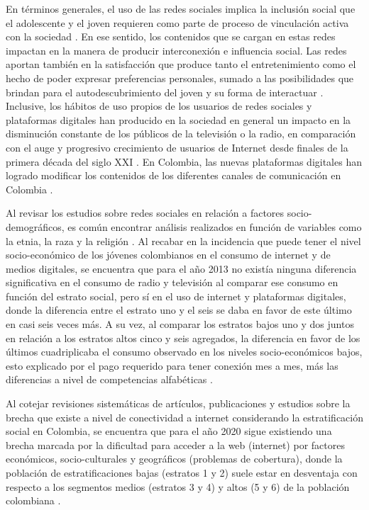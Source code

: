 \documentclass[spanish]{textolivre}
\begin{document}
En términos generales, el uso de las redes sociales implica la inclusión social que el adolescente y el joven requieren como parte de proceso de vinculación activa con la sociedad \cite{notley2009}. En ese sentido, los contenidos que se cargan en estas redes impactan en la manera de producir interconexión e influencia social. Las redes aportan también en la satisfacción que produce tanto el entretenimiento como  el hecho de poder expresar preferencias personales, sumado a las posibilidades que brindan para el autodescubrimiento del joven y su forma de interactuar \cite{arcilacalderon2017}. Inclusive, los hábitos de uso propios de los usuarios de redes sociales y plataformas digitales han producido en la sociedad en general un impacto en la disminución constante de los públicos de la televisión o la radio, en comparación con el auge y progresivo crecimiento de usuarios de Internet desde finales de la primera década del siglo XXI \cite{fraile2011}. En Colombia, las nuevas plataformas digitales han logrado modificar los contenidos de los diferentes canales de comunicación en Colombia \cite{gonzalez-gomez2018}.

Al revisar los estudios sobre redes sociales en relación a factores socio-demográficos, es común encontrar análisis realizados en función de variables como la etnia, la raza y la religión \cite{almansa-martinez2013}. Al recabar en la incidencia que puede tener el nivel socio-económico de los jóvenes colombianos en el consumo de internet y de medios digitales, se encuentra que para el año 2013 no existía ninguna diferencia significativa en el consumo de radio y televisión al comparar ese consumo en función del estrato social, pero sí en el uso de internet y plataformas digitales, donde la diferencia entre el estrato uno y el seis se daba en favor de este último en casi seis veces más. A su vez, al comparar los estratos bajos uno y dos juntos en relación a los estratos altos cinco y seis agregados, la diferencia en favor de los últimos cuadriplicaba el consumo observado en los niveles socio-económicos bajos, esto explicado por el pago requerido para tener conexión mes a mes, más las diferencias a nivel de competencias alfabéticas \cite{narvaez_montoya2013}.

Al cotejar revisiones sistemáticas de artículos, publicaciones y estudios sobre la brecha que existe a nivel de conectividad a internet considerando la estratificación social en Colombia, se encuentra que para el año 2020 sigue existiendo una brecha marcada por la dificultad para acceder a la web (internet) por factores económicos, socio-culturales y geográficos (problemas de cobertura), donde la población de estratificaciones bajas (estratos 1 y 2) suele estar en desventaja con respecto a los segmentos medios (estratos 3 y 4) y altos (5 y 6) de la población colombiana \cite{restrepo_tamayo2020}.
\end{document}
